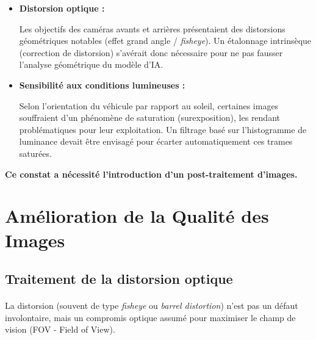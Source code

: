 \documentclass[12pt,a4paper,oneside]{report}
\begin{document}
\begin{itemize}[label=\textbullet, itemsep=0.3cm, leftmargin=2cm]
    \item \textbf{Distorsion optique :}\vspace{0.05cm}

 \hspace{0.5cm}Les objectifs des caméras avants et arrières présentaient des distorsions géométriques notables (effet grand angle / \textit{fisheye}). Un étalonnage intrinsèque (correction de distorsion) s'avérait donc nécessaire pour ne pas fausser l'analyse géométrique du modèle d'IA.

    \item \textbf{Sensibilité aux conditions lumineuses :}\vspace{0.05cm}

 \hspace{0.5cm}Selon l'orientation du véhicule par rapport au soleil, certaines images souffraient d'un phénomène de saturation (surexposition), les rendant problématiques pour leur exploitation. Un filtrage basé sur l'histogramme de luminance devait être envisagé pour écarter automatiquement ces trames saturées.

\end{itemize}

\vspace{1cm}

\textbf{\hspace{1cm}Ce constat a nécessité l'introduction d'un post-traitement d'images.}

\newpage

\section{Amélioration de la Qualité des Images}

\subsection{Traitement de la distorsion optique}

\paragraph{}
La distorsion (souvent de type \textit{fisheye} ou \textit{barrel distortion}) n'est pas un défaut involontaire, mais un compromis optique assumé pour maximiser le champ de vision (FOV - Field of View).
\end{document}
